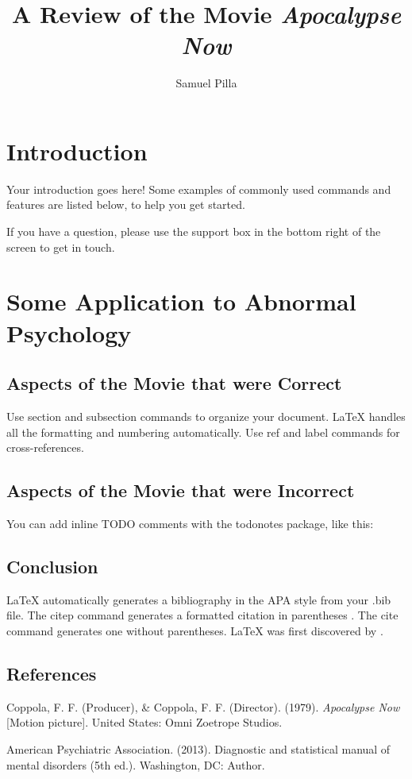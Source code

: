 \documentclass[a4paper,man,natbib]{apa6}
\title{A Review of the Movie \textit{Apocalypse Now}}
\author{Samuel Pilla}
\affiliation{Missouri University of Science and Technology}
\begin{document}
\maketitle

\section{Introduction}

Your introduction goes here! Some examples of commonly used commands and features are listed below, to help you get started.

If you have a question, please use the support box in the bottom right of the screen to get in touch. 

\section{Some Application to Abnormal Psychology}
\label{sec:examples}

\subsection{Aspects of the Movie that were Correct}

Use section and subsection commands to organize your document. \LaTeX{} handles all the formatting and numbering automatically. Use ref and label commands for cross-references.

\subsection{Aspects of the Movie that were Incorrect}

You can add inline TODO comments with the todonotes package, like this:

\subsection{Conclusion}

LaTeX automatically generates a bibliography in the APA style from your .bib file. The citep command generates a formatted citation in parentheses \citep{Lamport1986}. The cite command generates one without parentheses. LaTeX was first discovered by \cite{Lamport1986}.

\pagebreak

\subsection{References}
Coppola, F. F. (Producer), \& Coppola, F. F. (Director). (1979). \textit{Apocalypse Now} [Motion picture]. United States: Omni Zoetrope Studios.

American Psychiatric Association. (2013). Diagnostic and statistical manual of mental disorders (5th ed.). Washington, DC: Author.
\end{document}
